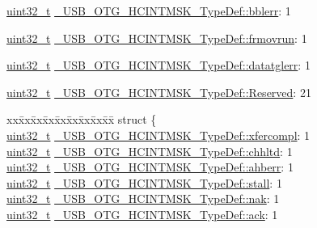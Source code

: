 \begin{DoxyCompactItemize}
\item 
\hyperlink{stdint_8h_a435d1572bf3f880d55459d9805097f62}{uint32\-\_\-t} \hyperlink{group___u_s_b___o_t_g___d_r_i_v_e_r_ga5c30859fd2a1da1586244f740e77ffb2}{\-\_\-\-U\-S\-B\-\_\-\-O\-T\-G\-\_\-\-H\-C\-I\-N\-T\-M\-S\-K\-\_\-\-Type\-Def\-::bblerr}\-: 1
\item 
\hyperlink{stdint_8h_a435d1572bf3f880d55459d9805097f62}{uint32\-\_\-t} \hyperlink{group___u_s_b___o_t_g___d_r_i_v_e_r_ga951f328c52972f9f8656799576b9f3a0}{\-\_\-\-U\-S\-B\-\_\-\-O\-T\-G\-\_\-\-H\-C\-I\-N\-T\-M\-S\-K\-\_\-\-Type\-Def\-::frmovrun}\-: 1
\item 
\hyperlink{stdint_8h_a435d1572bf3f880d55459d9805097f62}{uint32\-\_\-t} \hyperlink{group___u_s_b___o_t_g___d_r_i_v_e_r_gac87753918aa4ff268f9e7ce0a32fb9f0}{\-\_\-\-U\-S\-B\-\_\-\-O\-T\-G\-\_\-\-H\-C\-I\-N\-T\-M\-S\-K\-\_\-\-Type\-Def\-::datatglerr}\-: 1
\item 
\hyperlink{stdint_8h_a435d1572bf3f880d55459d9805097f62}{uint32\-\_\-t} \hyperlink{group___u_s_b___o_t_g___d_r_i_v_e_r_ga561314bd51b64e6b9f40b34dc8944e0b}{\-\_\-\-U\-S\-B\-\_\-\-O\-T\-G\-\_\-\-H\-C\-I\-N\-T\-M\-S\-K\-\_\-\-Type\-Def\-::\-Reserved}\-: 21
\item 
\begin{tabbing}
xx\=xx\=xx\=xx\=xx\=xx\=xx\=xx\=xx\=\kill
struct \{\\
\>\hyperlink{stdint_8h_a435d1572bf3f880d55459d9805097f62}{uint32\_t} \hyperlink{group___u_s_b___o_t_g___d_r_i_v_e_r_ga14412b191b38e4a7eb8f260ef7613fde}{\_USB\_OTG\_HCINTMSK\_TypeDef::xfercompl}: 1\\
\>\hyperlink{stdint_8h_a435d1572bf3f880d55459d9805097f62}{uint32\_t} \hyperlink{group___u_s_b___o_t_g___d_r_i_v_e_r_ga520845ff45958d50ae4a81157db6e4d4}{\_USB\_OTG\_HCINTMSK\_TypeDef::chhltd}: 1\\
\>\hyperlink{stdint_8h_a435d1572bf3f880d55459d9805097f62}{uint32\_t} \hyperlink{group___u_s_b___o_t_g___d_r_i_v_e_r_gada60e63ae630cebc4f260a670bc2a79f}{\_USB\_OTG\_HCINTMSK\_TypeDef::ahberr}: 1\\
\>\hyperlink{stdint_8h_a435d1572bf3f880d55459d9805097f62}{uint32\_t} \hyperlink{group___u_s_b___o_t_g___d_r_i_v_e_r_gaf98c0c2f8a26d5aab736432dbe766081}{\_USB\_OTG\_HCINTMSK\_TypeDef::stall}: 1\\
\>\hyperlink{stdint_8h_a435d1572bf3f880d55459d9805097f62}{uint32\_t} \hyperlink{group___u_s_b___o_t_g___d_r_i_v_e_r_ga103fcc638785131143028bce08cb0680}{\_USB\_OTG\_HCINTMSK\_TypeDef::nak}: 1\\
\>\hyperlink{stdint_8h_a435d1572bf3f880d55459d9805097f62}{uint32\_t} \hyperlink{group___u_s_b___o_t_g___d_r_i_v_e_r_ga0159abb7609563116d0b50b871d0ddfa}{\_USB\_OTG\_HCINTMSK\_TypeDef::ack}: 1\\

\end{tabbing}
\end{DoxyCompactItemize}
